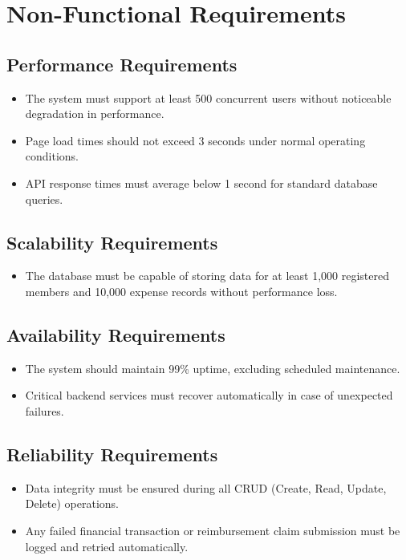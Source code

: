 \documentclass[12pt]{article}
\begin{document}
\section{Non-Functional Requirements}
  \subsection{Performance Requirements}
    \begin{itemize}
        \item The system must support at least 500 concurrent users without noticeable degradation in performance.
        \item Page load times should not exceed 3 seconds under normal operating conditions.
        \item API response times must average below 1 second for standard database queries.
    \end{itemize}

    \subsection{Scalability Requirements}
    \begin{itemize}
        \item The database must be capable of storing data for at least 1,000 registered members and 10,000 expense records without performance loss.
    \end{itemize}

    \subsection{Availability Requirements}
    \begin{itemize}
        \item The system should maintain 99\% uptime, excluding scheduled maintenance.
        \item Critical backend services must recover automatically in case of unexpected failures.
    \end{itemize}

    \subsection{Reliability Requirements}
    \begin{itemize}
        \item Data integrity must be ensured during all CRUD (Create, Read, Update, Delete) operations.
        \item Any failed financial transaction or reimbursement claim submission must be logged and retried automatically.
    \end{itemize}
\end{document}
